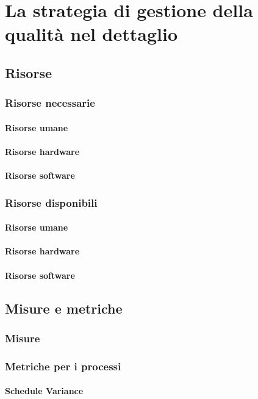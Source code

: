 \section{La strategia di gestione della qualità nel dettaglio}
	\subsection{Risorse}
		\subsubsection{Risorse necessarie}
			\paragraph{Risorse umane}
			\paragraph{Risorse hardware}
			\paragraph{Risorse software}
		\subsubsection{Risorse disponibili}
			\paragraph{Risorse umane}
			\paragraph{Risorse hardware}
			\paragraph{Risorse software}
	\subsection{Misure e metriche}
		\subsubsection{Misure}
		\subsubsection{Metriche per i processi}
			\paragraph{Schedule Variance}
